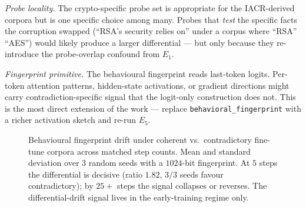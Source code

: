 \documentclass[11pt,a4paper]{article}
\begin{document}
\emph{Probe locality.}  The crypto\nobreakdash-specific probe set is
appropriate for the IACR\nobreakdash-derived corpora but is one
specific choice among many.  Probes that \emph{test} the
specific facts the corruption swapped (``RSA's security relies
on'' under a corpus where ``RSA'' \textrightarrow ``AES'') would
likely produce a larger differential — but only because they
re\nobreakdash-introduce the probe\nobreakdash-overlap confound from $E_1$.

\emph{Fingerprint primitive.}  The behavioural fingerprint reads
last\nobreakdash-token logits.  Per\nobreakdash-token attention
patterns, hidden\nobreakdash-state activations, or gradient
directions might carry contradiction\nobreakdash-specific signal
that the logit\nobreakdash-only construction does not.  This is
the most direct extension of the work — replace
\texttt{behavioral\_fingerprint} with a richer activation
sketch and re\nobreakdash-run $E_5$.

\begin{figure}[h]
  \centering
  \caption{Behavioural fingerprint drift under coherent vs.\
    contradictory fine\nobreakdash-tune corpora across matched step
    counts.  Mean and standard deviation over $3$ random seeds with
    a $1024$\nobreakdash-bit fingerprint.  At $5$ steps the
    differential is decisive (ratio $1.82$, $3/3$ seeds favour
    contradictory); by $25+$ steps the signal collapses or reverses.
    The differential\nobreakdash-drift signal lives in the
    early\nobreakdash-training regime only.}
  \label{fig:poisoning:bars}
\end{figure}
\end{document}
